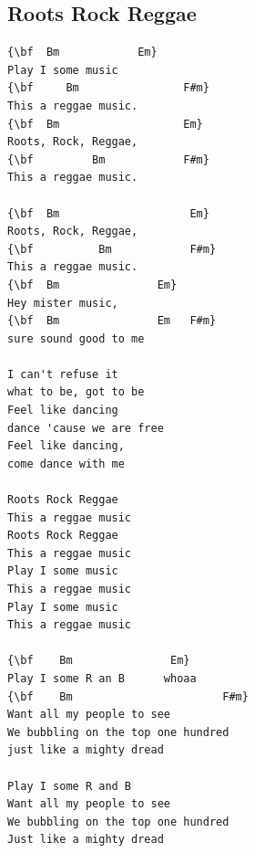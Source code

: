 \documentclass[a4paper]{article}
\begin{document}
\subsection{Roots Rock Reggae}
\begin{multicols}{2}\begin{Verbatim}[commandchars=\\\{\}]
{\bf  Bm            Em}
Play I some music
{\bf     Bm                F#m}
This a reggae music.
{\bf  Bm                   Em}
Roots, Rock, Reggae,
{\bf         Bm            F#m}
This a reggae music.

{\bf  Bm                    Em}
Roots, Rock, Reggae,
{\bf          Bm            F#m}
This a reggae music.
{\bf  Bm               Em}
Hey mister music,
{\bf  Bm               Em   F#m}
sure sound good to me

I can't refuse it
what to be, got to be
Feel like dancing
dance 'cause we are free
Feel like dancing,
come dance with me

Roots Rock Reggae
This a reggae music
Roots Rock Reggae
This a reggae music
Play I some music
This a reggae music
Play I some music
This a reggae music

{\bf    Bm               Em}
Play I some R an B      whoaa
{\bf    Bm                       F#m}
Want all my people to see
We bubbling on the top one hundred
just like a mighty dread

Play I some R and B
Want all my people to see
We bubbling on the top one hundred
Just like a mighty dread

\end{Verbatim}
\end{multicols}\newpage
\end{document}
